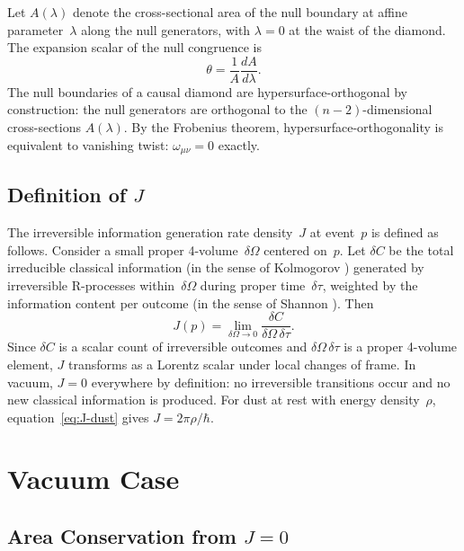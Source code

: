 \documentclass[12pt]{article}
\begin{document}
Let $A(\lambda)$ denote the cross-sectional area of the null
boundary at affine parameter~$\lambda$ along the null generators,
with $\lambda=0$ at the waist of the diamond.
The expansion scalar of the null congruence is
\begin{equation}
  \theta = \frac{1}{A}\frac{dA}{d\lambda}. \label{eq:expansion}
\end{equation}
The null boundaries of a causal diamond are hypersurface-orthogonal
by construction: the null generators are orthogonal to the
$(n{-}2)$-dimensional cross-sections $A(\lambda)$.
By the Frobenius theorem, hypersurface-orthogonality is equivalent
to vanishing twist: $\omega_{\mu\nu}=0$ exactly.

\subsection{Definition of $J$}

The irreversible information generation rate density~$J$ at
event~$p$ is defined as follows.
Consider a small proper 4-volume~$\delta\Omega$ centered on~$p$.
Let $\delta C$ be the total irreducible classical information
(in the sense of Kolmogorov \cite{Kolmogorov1965}) generated
by irreversible R-processes within~$\delta\Omega$ during proper
time~$\delta\tau$, weighted by the information content per
outcome (in the sense of Shannon \cite{Shannon1948}).
Then
\begin{equation}
  J(p) = \lim_{\delta\Omega\to 0}
  \frac{\delta C}{\delta\Omega\,\delta\tau}. \label{eq:J-def}
\end{equation}
Since $\delta C$ is a scalar count of irreversible outcomes
and $\delta\Omega\,\delta\tau$ is a proper 4-volume element,
$J$ transforms as a Lorentz scalar under local changes of frame.
In vacuum, $J=0$ everywhere by definition: no irreversible
transitions occur and no new classical information is produced.
For dust at rest with energy density~$\rho$,
equation~\eqref{eq:J-dust} gives $J = 2\pi\rho/\hbar$.

\section{Vacuum Case}
\label{sec:vacuum}

\subsection{Area Conservation from $J=0$}
\end{document}

